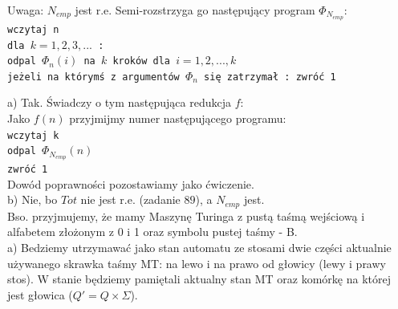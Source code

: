 \documentclass[a4paper,11pt]{article}
\newenvironment{zadanie}[1]
  {\renewcommand\theinnercustomthm{#1}\innercustomthm}
  {\endinnercustomthm}
\begin{document}
\begin{zadanie}{105}
\end{zadanie}
Uwaga: $N_{emp}$ jest r.e. Semi-rozstrzyga go następujący program $\Phi_{N_{emp}}$: \\
\texttt{wczytaj n \\ dla $k=1,2,3,...$ : \\ odpal $\Phi_n(i)$ na $k$ kroków dla $i=1,2,...,k$ \\ jeżeli na którymś z argumentów $\Phi_n$ się zatrzymał : zwróć 1 \\}

a) Tak. Świadczy o tym następująca redukcja $f$: \\
Jako $f(n)$ przyjmijmy numer następującego programu: \\
\texttt{wczytaj k \\ odpal $\Phi_{N_{emp}}(n)$ \\ zwróć 1 \\}
Dowód poprawności pozostawiamy jako ćwiczenie. \\

b) Nie, bo $Tot$ nie jest r.e. (zadanie $89$), a $N_{emp}$ jest.\\


\begin{zadanie}{110}
\end{zadanie}
Bso. przyjmujemy, że mamy Maszynę Turinga z pustą taśmą wejściową i alfabetem złożonym z 0 i 1 oraz symbolu pustej taśmy - B. \\
a) Bedziemy utrzymawać jako stan automatu ze stosami dwie części aktualnie używanego skrawka taśmy MT: na lewo i na prawo od
głowicy (lewy i prawy stos). W stanie będziemy pamiętali aktualny stan MT oraz komórkę na której jest głowica 
($Q' = Q \times \Sigma$). \\

\end{document}
